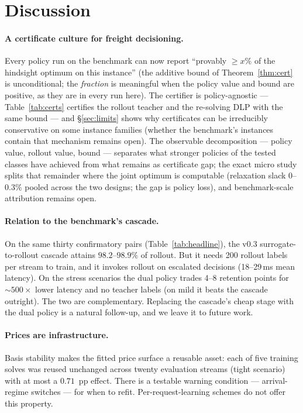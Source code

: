 \documentclass[11pt]{article}
\begin{document}
\section{Discussion}
\label{sec:discussion}

\paragraph{A certificate culture for freight decisioning.} Every policy
run on the benchmark can now report ``provably $\geq x\%$ of the
hindsight optimum on this instance'' (the additive bound of
Theorem~\ref{thm:cert} is unconditional; the \emph{fraction} is
meaningful when the policy value and bound are positive, as they are
in every run here). The certifier is policy-agnostic --- Table~\ref{tab:certs}
certifies the rollout teacher and the re-solving DLP with the same
bound --- and \S\ref{sec:limits} shows why certificates can be
irreducibly conservative on some instance families (whether the
benchmark's instances contain that mechanism remains open). The observable decomposition ---
policy value, rollout value, bound --- separates what stronger
policies of the tested classes have achieved from what remains as
certificate gap; the exact micro study splits that remainder where the
joint optimum is computable (relaxation slack $0$--$0.3\%$ pooled
across the two designs; the gap is policy loss), and benchmark-scale
attribution remains open.

\paragraph{Relation to the benchmark's cascade.} On the same thirty
confirmatory pairs (Table~\ref{tab:headline}), the v0.3 surrogate-to-rollout
cascade \citep{chandrasekaran2026freightbidbench} attains
$98.2$--$98.9\%$ of rollout. But it needs 200
rollout labels per stream to train, and it invokes rollout on
escalated decisions (18--29\,ms mean latency). On the stress
scenarios the dual policy trades 4--8 retention points for
${\sim}500\times$ lower latency and no teacher labels (on mild it
beats the cascade outright).
The two are complementary. Replacing the cascade's cheap stage with the
dual policy is a natural follow-up, and we leave it to future work.

\paragraph{Prices are infrastructure.} Basis stability makes the fitted
price surface a reusable asset: each of five training solves was
reused unchanged across twenty evaluation streams (tight scenario)
with at most a $0.71$~pp effect. There is a testable warning condition --- arrival-regime
switches --- for when to refit. Per-request-learning schemes do not
offer this property.
\end{document}
